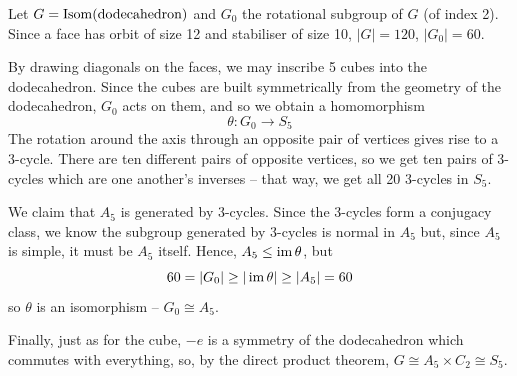 \documentclass{../../template/note}
\begin{document}
    \begin{example}
        Let \(G = \operatorname{Isom}(\text{dodecahedron})\) and \(G_0\) the rotational subgroup of \(G\) (of index 2). Since a face has orbit of size 12 and stabiliser of size 10, \(|G| = 120\), \(|G_0| = 60\).

        By drawing diagonals on the faces, we may inscribe 5 cubes into the dodecahedron. Since the cubes are built symmetrically from the geometry of the dodecahedron, \(G_0\) acts on them, and so we obtain a homomorphism
        \[  
            \theta: G_0 \to S_5
        \]
        The rotation around the axis through an opposite pair of vertices gives rise to a 3-cycle. There are ten different pairs of opposite vertices, so we get ten pairs of 3-cycles which are one another's inverses -- that way, we get all 20 3-cycles in \(S_5\).

        We claim that \(A_5\) is generated by 3-cycles. Since the 3-cycles form a conjugacy class, we know the subgroup generated by 3-cycles is normal in \(A_5\) but, since \(A_5\) is simple, it must be \(A_5\) itself. Hence, \(A_5 \leq \operatorname{im} \theta\), but
        \[
            60 = |G_0| \geq |\operatorname{im} \theta| \geq |A_5| = 60
        \]
        so \(\theta\) is an isomorphism -- \(G_0 \cong A_5\).

        Finally, just as for the cube, \(-e\) is a symmetry of the dodecahedron which commutes with everything, so, by the direct product theorem, \(G \cong A_5 \times C_2 \cong S_5\).
    \end{example}
    
    
    
    
\end{document}
